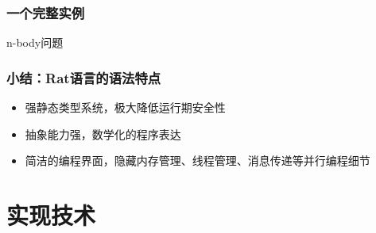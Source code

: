 \documentclass{beamer}
\begin{document}
\begin{frame}[t]
\end{frame}

\begin{frame}
  \frametitle{一个完整实例}
  n-body问题
  
\end{frame}

\begin{frame}
  \frametitle{小结：Rat语言的语法特点}
  \begin{itemize}
    \item 强静态类型系统，极大降低运行期安全性
    \item 抽象能力强，数学化的程序表达
    \item 简洁的编程界面，隐藏内存管理、线程管理、消息传递等并行编程细节
  \end{itemize}
\end{frame}

\section{实现技术}
\frame{\tableofcontents[currentsection]}
\end{document}
